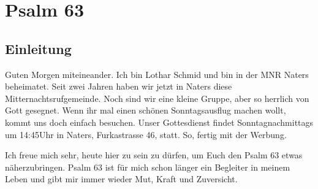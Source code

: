 \documentclass[14pt]{mybib}
\author{Lothar Schmid}
\begin{document}
\setlength{\baselineskip}{1.5\baselineskip}

\section*{Psalm 63}
    \subsection*{Einleitung}
    Guten Morgen miteineander. Ich bin Lothar Schmid und bin in der MNR Naters beheimatet. Seit zwei Jahren haben wir jetzt in Naters diese Mitternachtsrufgemeinde. Noch sind wir eine kleine Gruppe, aber so herrlich von Gott gesegnet. Wenn ihr mal einen schönen Sonntagsausflug machen wollt, kommt uns doch einfach besuchen. Unser Gottesdienst findet Sonntagnachmittags um 14:45Uhr in Naters, Furkastrasse 46, statt. So, fertig mit der Werbung.
    
    Ich freue mich sehr, heute hier zu sein zu dürfen, um Euch den Psalm 63 etwas näherzubringen. Psalm 63 ist für mich schon länger ein Begleiter in meinem Leben und gibt mir immer wieder Mut, Kraft und Zuversicht. 
\end{document}
